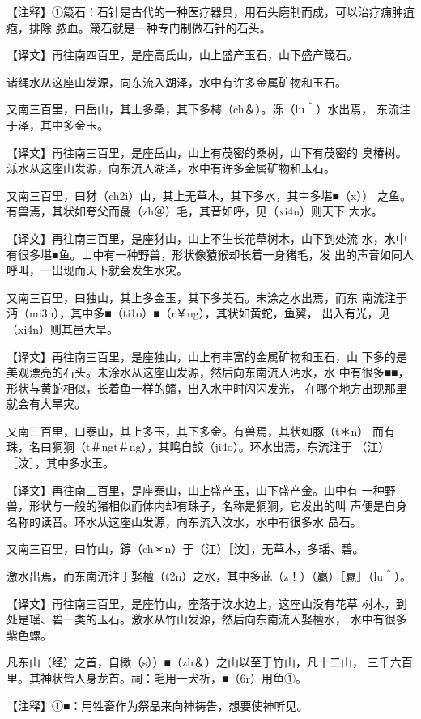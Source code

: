\documentclass[a4paper,12pt,UTF8,twoside]{ctexbook}
\begin{document}
【注释】①箴石：石针是古代的一种医疗器具，用石头磨制而成，可以治疗痈肿疽疱，排除 脓血。箴石就是一种专门制做石针的石头。

【译文】再往南四百里，是座高氏山，山上盛产玉石，山下盛产箴石。

诸绳水从这座山发源，向东流入湖泽，水中有许多金属矿物和玉石。

又南三百里，曰岳山，其上多桑，其下多樗（ch＆）。泺（lu＾）水出焉， 东流注于泽，其中多金玉。

【译文】再往南三百里，是座岳山，山上有茂密的桑树，山下有茂密的 臭椿树。泺水从这座山发源，向东流入湖泽，水中有许多金属矿物和玉石。

又南三百里，曰犲（ch2i）山，其上无草木，其下多水，其中多堪■（x）） 之鱼。有兽焉，其状如夸父而彘（zh＠）毛，其音如呼，见（xi4n）则天下 大水。

【译文】再往南三百里，是座犲山，山上不生长花草树木，山下到处流 水，水中有很多堪■鱼。山中有一种野兽，形状像猿猴却长着一身猪毛，发 出的声音如同人呼叫，一出现而天下就会发生水灾。

又南三百里，曰独山，其上多金玉，其下多美石。末涂之水出焉，而东 南流注于沔（mi3n），其中多■（ti1o）■（r￥ng），其状如黄蛇，鱼翼， 出入有光，见（xi4n）则其邑大旱。

【译文】再往南三百里，是座独山，山上有丰富的金属矿物和玉石，山 下多的是美观漂亮的石头。未涂水从这座山发源，然后向东南流入沔水，水 中有很多■■，形状与黄蛇相似，长着鱼一样的鳍，出入水中时闪闪发光， 在哪个地方出现那里就会有大旱灾。

又南三百里，曰泰山，其上多玉，其下多金。有兽焉，其状如豚（t＊n） 而有珠，名曰狪狪（t＃ngt＃ng），其鸣自詨（ji4o）。环水出焉，东流注于 （江）［汶］，其中多水玉。

【译文】再往南三百里，是座泰山，山上盛产玉，山下盛产金。山中有 一种野兽，形状与一般的猪相似而体内却有珠子，名称是狪狪，它发出的叫 声便是自身名称的读音。环水从这座山发源，向东流入汶水，水中有很多水 晶石。

又南三百里，曰竹山，錞（ch＊n）于（江）［汶］，无草木，多瑶、碧。

激水出焉，而东南流注于娶檀（t2n）之水，其中多茈（z！）（羸）［蠃］（lu＾）。

【译文】再往南三百里，是座竹山，座落于汶水边上，这座山没有花草 树木，到处是瑶、碧一类的玉石。激水从竹山发源，然后向东南流入娶檀水， 水中有很多紫色螺。

凡东山（经）之首，自樕（s））■（zh＆）之山以至于竹山，凡十二山， 三千六百里。其神状皆人身龙首。祠：毛用一犬祈，■（6r）用鱼①。

【注释】①■：用牲畜作为祭品来向神祷告，想要使神听见。
\end{document}
